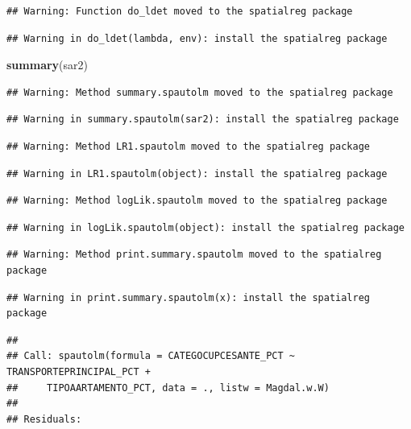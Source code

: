 \documentclass[11pt,]{article}
\newenvironment{Shaded}{\begin{snugshade}}{\end{snugshade}}
\newcommand{\KeywordTok}[1]{\textcolor[rgb]{0.13,0.29,0.53}{\textbf{#1}}}
\newcommand{\NormalTok}[1]{#1}
\begin{document}
\begin{verbatim}
## Warning: Function do_ldet moved to the spatialreg package
\end{verbatim}

\begin{verbatim}
## Warning in do_ldet(lambda, env): install the spatialreg package
\end{verbatim}

\begin{Shaded}
\begin{Highlighting}[]
\KeywordTok{summary}\NormalTok{(sar2)}
\end{Highlighting}
\end{Shaded}

\begin{verbatim}
## Warning: Method summary.spautolm moved to the spatialreg package
\end{verbatim}

\begin{verbatim}
## Warning in summary.spautolm(sar2): install the spatialreg package
\end{verbatim}

\begin{verbatim}
## Warning: Method LR1.spautolm moved to the spatialreg package
\end{verbatim}

\begin{verbatim}
## Warning in LR1.spautolm(object): install the spatialreg package
\end{verbatim}

\begin{verbatim}
## Warning: Method logLik.spautolm moved to the spatialreg package
\end{verbatim}

\begin{verbatim}
## Warning in logLik.spautolm(object): install the spatialreg package
\end{verbatim}

\begin{verbatim}
## Warning: Method print.summary.spautolm moved to the spatialreg package
\end{verbatim}

\begin{verbatim}
## Warning in print.summary.spautolm(x): install the spatialreg package
\end{verbatim}

\begin{verbatim}
## 
## Call: spautolm(formula = CATEGOCUPCESANTE_PCT ~ TRANSPORTEPRINCIPAL_PCT + 
##     TIPOAARTAMENTO_PCT, data = ., listw = Magdal.w.W)
## 
## Residuals:
\end{verbatim}
\end{document}

